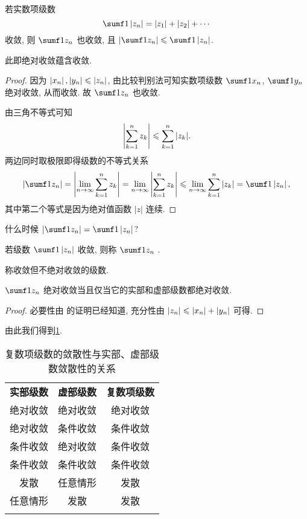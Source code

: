 \begin{theorem}
  \label{thm:absolute-convergent}
  若实数项级数
  \[
    \sumf1 \abs{z_n}=|z_1|+|z_2|+\cdots
  \]
  收敛, 则 $\sumf1 z_n$ 也收敛, 且 $\abs{\sumf1 z_n}\le\sumf1 \abs{z_n}$.
\end{theorem}

此即绝对收敛蕴含收敛.

\begin{proof}
  因为 $\left|x_n\right|,\left|y_n\right|\leqslant\left|z_n\right|$, 由比较判别法可知实数项级数 $\sumf1 x_n$, $\sumf1 y_n$ 绝对收敛, 从而收敛.
  故 $\sumf1 z_n$ 也收敛.

  由三角不等式可知
  \[
    \left|\sum_{k=1}^n z_k\right|\leqslant \sum_{k=1}^n|z_k|.
  \]
  两边同时取极限即得级数的不等式关系
  \[
     \abs{\sumf1 z_n}
    =\abs{\lim_{n\ra\infty}\sum_{k=1}^n z_k}
    =\lim_{n\ra\infty}\abs{\sum_{k=1}^n z_k}
    \le\lim_{n\ra\infty}\sum_{k=1}^n|z_k|
    =\sumf1 \abs{z_n},
  \]
  其中第二个等式是因为绝对值函数 $|z|$ 连续.
\end{proof}

\begin{exercise}
  什么时候 $\abs{\sumf1 z_n}=\sumf1 \abs{z_n}$?
\end{exercise}

\begin{definition}
  \begin{enumpar}
    \item 若级数 $\sumf1 \abs{z_n}$ 收敛, 则称 $\sumf1 z_n$ .
    \item 称收敛但不绝对收敛的级数.
  \end{enumpar}
\end{definition}

\begin{theorem}
  $\sumf1 z_n$ 绝对收敛当且仅当它的实部和虚部级数都绝对收敛.
\end{theorem}

\begin{proof}
  必要性由 的证明已经知道,
  充分性由 $\left|z_n\right|\leqslant\left|x_n\right|+\left|y_n\right|$ 可得.
\end{proof}

由此我们得到\ref{tab:convergent-re-im}.

\begin{table}[!htb]
  \centering
  \begin{tabular}{ccc} \topcolorrule
    \bf 实部级数&\bf 虚部级数&\bf 复数项级数\\ \topcolorrule
    绝对收敛&绝对收敛&绝对收敛\\ \midcolorrule
    绝对收敛&条件收敛&条件收敛\\ \midcolorrule
    条件收敛&绝对收敛&条件收敛\\ \midcolorrule
    条件收敛&条件收敛&条件收敛\\ \midcolorrule
    发散&任意情形&发散\\ \midcolorrule
    任意情形&发散&发散\\ \bottomcolorrule
  \end{tabular}
  \caption{复数项级数的敛散性与实部、虚部级数敛散性的关系}
  \label{tab:convergent-re-im}
\end{table}

